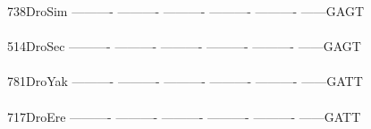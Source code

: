 \documentclass[11pt,twoside,reqno,a4paper]{article}
\begin{document}
{738\hspace*{2\charwidth}DroSim	----------	----------	----------	----------	----------	------GAGT	\\
\hspace*{5\charwidth}\hspace*{7\charwidth}\hspace*{1\charwidth}\hspace*{1\charwidth}\hspace*{1\charwidth}\hspace*{1\charwidth}\hspace*{1\charwidth}\hspace*{1\charwidth}\\
514\hspace*{2\charwidth}DroSec	----------	----------	----------	----------	----------	------GAGT	\\
\hspace*{5\charwidth}\hspace*{7\charwidth}\hspace*{1\charwidth}\hspace*{1\charwidth}\hspace*{1\charwidth}\hspace*{1\charwidth}\hspace*{1\charwidth}\hspace*{1\charwidth}\\
781\hspace*{2\charwidth}DroYak	----------	----------	----------	----------	----------	------GATT	\\
\hspace*{5\charwidth}\hspace*{7\charwidth}\hspace*{1\charwidth}\hspace*{1\charwidth}\hspace*{1\charwidth}\hspace*{1\charwidth}\hspace*{1\charwidth}\hspace*{1\charwidth}\\
717\hspace*{2\charwidth}DroEre	----------	----------	----------	----------	----------	------GATT	\\
\hspace*{5\charwidth}\hspace*{7\charwidth}\hspace*{1\charwidth}\hspace*{1\charwidth}\hspace*{1\charwidth}\hspace*{1\charwidth}\hspace*{1\charwidth}\hspace*{1\charwidth}\\
}
\end{document}
